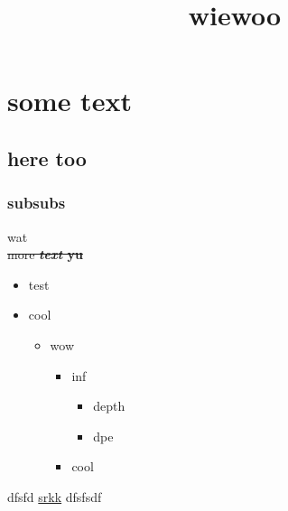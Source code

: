 \documentclass[a4paper,12pt]{article}
\begin{document}
\title{wiewoo}
\maketitle
\newpage
\section{some text}
\subsection{here too}
\subsubsection{subsubs}
wat
 \\ 
\sout{more \textbf{\textit{text} yu}}
 \\ 
\begin{itemize}
\item test
\item cool
\begin{itemize}
\item wow
\begin{itemize}
\item inf
\begin{itemize}
\item depth
\item dpe
\end{itemize}
\item cool
\end{itemize}
\end{itemize}
\end{itemize}
dfsfd \href{https://beaversinfos.weebly.com/}{srkk} dfsfsdf
 \\ 
\end{document}
